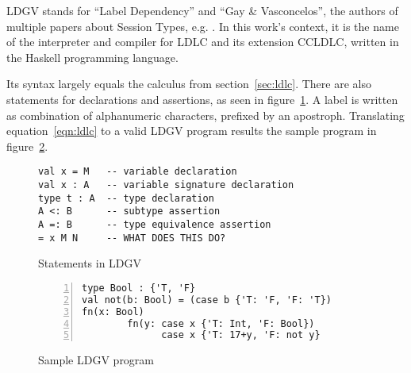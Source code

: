 LDGV stands for ``Label Dependency'' and ``Gay \& Vasconcelos'', the authors of multiple papers about Session Types, e.g. \cite{gayvasconcelos2010}. In this work's context, it is the name of the interpreter and compiler for LDLC and its extension CCLDLC, written in the Haskell programming language.

Its syntax largely equals the calculus from section~\ref{sec:ldlc}. There are also statements for declarations and assertions, as seen in figure~\ref{fig:ldgv-statements}.
A label is written as combination of alphanumeric characters, prefixed by an apostroph. Translating equation~\ref{eqn:ldlc} to a valid LDGV program results the sample program in figure~\ref{fig:ldgv-program}.

\begin{figure}
\begin{lstlisting}[language=ldgv]
val x = M   -- variable declaration
val x : A   -- variable signature declaration
type t : A  -- type declaration
A <: B      -- subtype assertion
A =: B      -- type equivalence assertion
= x M N     -- WHAT DOES THIS DO?
\end{lstlisting}
\caption{Statements in LDGV}
\label{fig:ldgv-statements}
\end{figure}

\begin{figure}
\begin{lstlisting}[language=ldgv,numbers=left]
type Bool : {'T, 'F}
val not(b: Bool) = (case b {'T: 'F, 'F: 'T})
fn(x: Bool)
        fn(y: case x {'T: Int, 'F: Bool})
              case x {'T: 17+y, 'F: not y}
\end{lstlisting}
\caption{Sample LDGV program}
\label{fig:ldgv-program}
\end{figure}
